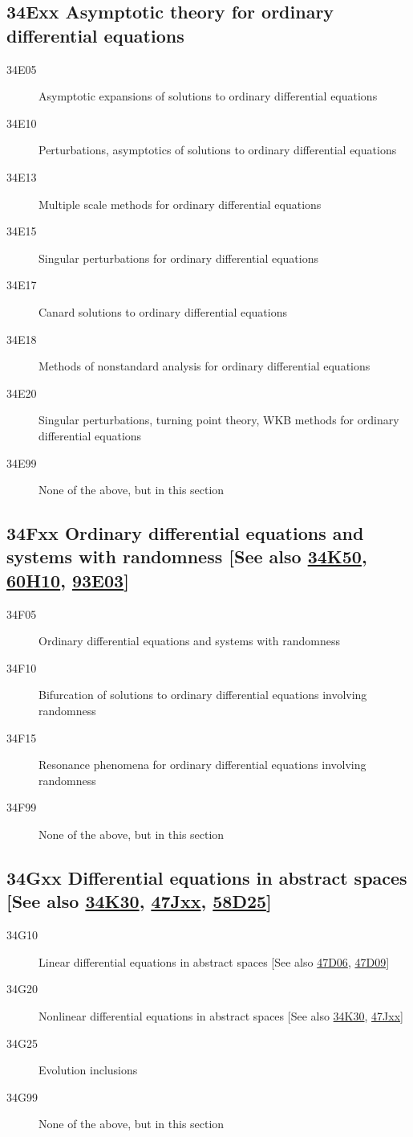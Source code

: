 \subsection*{34Exx  Asymptotic theory for ordinary differential equations }\label{34Exx}
\begin{description}  
\item [34E05]\label{34E05} Asymptotic expansions of solutions to ordinary differential equations
\item [34E10]\label{34E10} Perturbations, asymptotics of solutions to ordinary differential equations
\item [34E13]\label{34E13} Multiple scale methods for ordinary differential equations
\item [34E15]\label{34E15} Singular perturbations for ordinary differential equations
\item [34E17]\label{34E17} Canard solutions to ordinary differential equations
\item [34E18]\label{34E18} Methods of nonstandard analysis for ordinary differential equations
\item [34E20]\label{34E20} Singular perturbations, turning point theory, WKB methods for ordinary differential equations
\item [34E99]\label{34E99} None of the above, but in this section
\end{description}
\subsection*{34Fxx  Ordinary differential equations and systems with randomness [See also \hyperref[34K50]{34K50}, \hyperref[60H10]{60H10}, \hyperref[93E03]{93E03}]}\label{34Fxx}
\begin{description}  
\item [34F05]\label{34F05} Ordinary differential equations and systems with randomness
\item [34F10]\label{34F10} Bifurcation of solutions to ordinary differential equations involving randomness
\item [34F15]\label{34F15} Resonance phenomena for ordinary differential equations involving randomness
\item [34F99]\label{34F99} None of the above, but in this section
\end{description}
\subsection*{34Gxx  Differential equations in abstract spaces [See also \hyperref[34K30]{34K30}, \hyperref[47Jxx]{47Jxx}, \hyperref[58D25]{58D25}] }\label{34Gxx}
\begin{description}  
\item [34G10]\label{34G10} Linear differential equations in abstract spaces [See also \hyperref[47D06]{47D06}, \hyperref[47D09]{47D09}]
\item [34G20]\label{34G20} Nonlinear differential equations in abstract spaces [See also \hyperref[34K30]{34K30}, \hyperref[47Jxx]{47Jxx}]
\item [34G25]\label{34G25} Evolution inclusions
\item [34G99]\label{34G99} None of the above, but in this section
\end{description}
